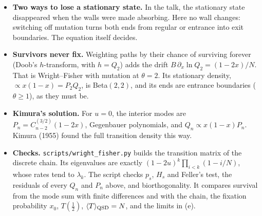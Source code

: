 \documentclass[11pt]{article}
\newcommand{\avg}[1]{\langle #1\rangle}
\newcommand{\exsec}[1]{\par\vspace{6pt}{\sffamily\bfseries\large\color{PineGreen}#1}\par\vspace{-2pt}}
\begin{document}
\exsec{For the discussion}
\begin{itemize}
  \item \textbf{Two ways to lose a stationary state.} In the talk, the stationary state disappeared when the walls
        were made absorbing. Here no wall changes: switching off mutation turns both ends from regular or entrance
        into exit boundaries. The equation itself decides.
  \item \textbf{Survivors never fix.} Weighting paths by their chance of surviving forever (Doob's $h$-transform,
        with $h=Q_2$) adds the drift $B\,\partial_x\ln Q_2=(1-2x)/N$. That is Wright--Fisher with mutation at
        $\theta=2$. Its stationary density, $\propto x(1-x)=P_2Q_2$, is Beta$(2,2)$, and its ends are entrance
        boundaries ($\theta\ge1$), as they must be.
  \item \textbf{Kimura's solution.} For $u=0$, the interior modes are $P_n=C^{(3/2)}_{n-2}(1-2x)$, Gegenbauer
        polynomials, and $Q_n\propto x(1-x)P_n$. Kimura (1955) found the full transition density this way.
  \item \textbf{Checks.} \texttt{scripts/wright\_fisher.py} builds the transition matrix of the discrete chain. Its
        eigenvalues are exactly $(1-2u)^k\prod_{i<k}(1-i/N)$, whose rates tend to $\lambda_k$. The script checks
        $p_s$, $H_s$ and Feller's test, the residuals of every $Q_n$ and $P_n$ above, and biorthogonality. It
        compares survival from the mode sum with finite differences and with the chain, the fixation probability
        $x_0$, $T(\frac12)$, $\avg T_{\rm QSD}=N$, and the limits in (e).
\end{itemize}
\end{document}
